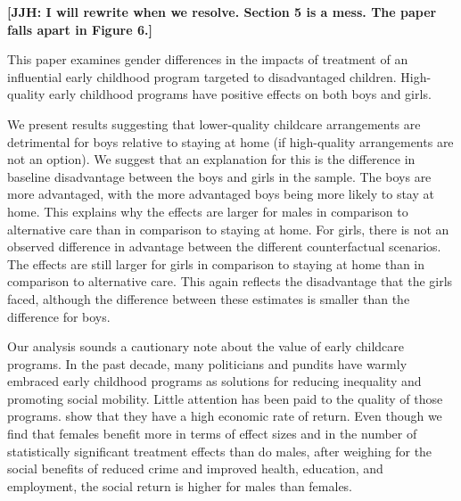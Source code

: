 \textbf{[JJH: I will rewrite when we resolve. Section 5 is a mess. The paper falls apart in Figure 6.]}

This paper examines gender differences in the impacts of treatment of an influential early childhood program targeted to disadvantaged children. High-quality early childhood programs have positive effects on both boys and girls.

We present results suggesting that lower-quality childcare arrangements are detrimental for boys relative to staying at home (if high-quality arrangements are not an option). We suggest that an explanation for this is the difference in baseline disadvantage between the boys and girls in the sample. The boys are more advantaged, with the more advantaged boys being more likely to stay at home. This explains why the effects are larger for males in comparison to alternative care than in comparison to staying at home. For girls, there is not an observed difference in advantage between the different counterfactual scenarios. The effects are still larger for girls in comparison to staying at home than in comparison to alternative care. This again reflects the disadvantage that the girls faced, although the difference between these estimates is smaller than the difference for boys.

Our analysis sounds a cautionary note about the value of early childcare programs. In the past decade, many politicians and pundits have warmly embraced early childhood programs as solutions for reducing inequality and promoting social mobility. Little attention has been paid to the quality of those programs. \cite{Garcia_Heckman_Leaf_etal_2017_Comp_CBA_Unpublished} show that they have a high economic rate of return. Even though we find that females benefit more in terms of effect sizes and in the number of statistically significant treatment effects than do males, after weighing for the social benefits of reduced crime and improved health, education, and employment, the social return is higher for males than females.